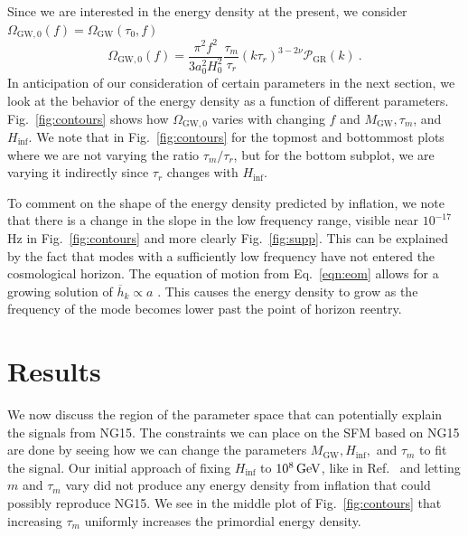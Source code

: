 \documentclass[prd,twocolumn,aps,psfig,nofootinbib,nobibnotes,superscriptaddress,preprintnumbers,times]{revtex4-2}
\newcommand{\GeV}{\,{\rm GeV}}
\begin{document}
Since we are interested in the energy density at the present, we consider $\Omega_{\text{GW},0}(f) = \Omega_\text{GW}(\tau_0,f)$
\begin{equation}\label{eqn:om_gw_0}
    \Omega_{\text{GW},0}(f) = \frac{\pi^2f^2}{3a_0^2 H_0^2}\frac{\tau_m}{\tau_r}(k\tau_r)^{3-2\nu}\mathcal{P}_{\text{GR}}(k) \ .
\end{equation}
In anticipation of our consideration of certain parameters in the next section, we look at the behavior of the energy density as a function of different parameters. Fig.\ \ref{fig:contours} shows how $\Omega_{\text{GW},0}$ varies with changing $f$ and $M_{\text{GW}}, \tau_m$, and $H_{\inf}$. We note that in Fig.\ \ref{fig:contours} for the topmost and bottommost plots where we are not varying the ratio $\tau_m/\tau_r$, but for the bottom subplot, we are varying it indirectly since $\tau_r$ changes with $H_{\inf}$.

To comment on the shape of the energy density predicted by inflation, we note that there is a change in the slope in the low frequency range, visible near $10^{-17}$ Hz in Fig.\ \ref{fig:contours} and more clearly Fig.\ \ref{fig:supp}. This can be explained by the fact that modes with a sufficiently low frequency have not entered the cosmological horizon. The equation of motion from Eq.\ \ref{eqn:eom} allows for a growing solution of $\overline{h}_k \propto a$ \cite{Gumrukcuoglu:2012wt}. This causes the energy density to grow as the frequency of the mode becomes lower past the point of horizon reentry. 

\section{Results}\label{sec:results}
We now discuss the region of the parameter space that can potentially explain the signals from NG15. The constraints we can place on the SFM based on NG15 are done by seeing how we can change the parameters $M_{\text{GW}}, H_{\inf},$ and $\tau_m$ to fit the signal. Our initial approach of fixing $H_{\inf}$ to $10^8 \GeV$, like in Ref.\ \cite{Fujita:2018ehq} and letting $m$ and $\tau_m$ vary did not produce any energy density from inflation that could possibly reproduce NG15. We see in the middle plot of Fig.\ \ref{fig:contours} that increasing $\tau_m$ uniformly increases the primordial energy density. 
\end{document}
